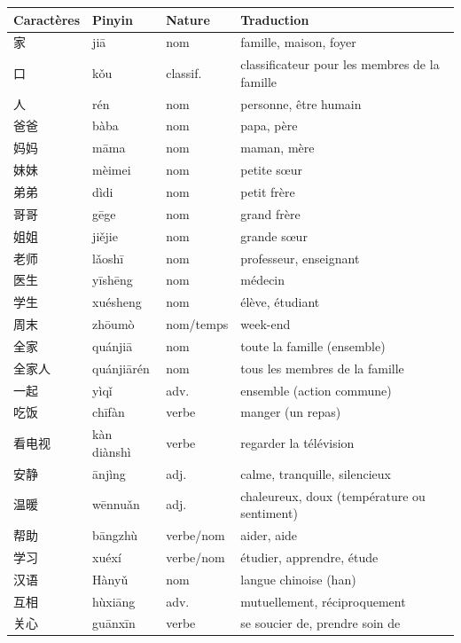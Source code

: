 \documentclass[11pt]{article}
\begin{document}
\begin{center}
\begin{tabularx}{\linewidth}{|X|X|X|X|}\hline
\rowcolor{popblueL} \textbf{Caractères} & \textbf{Pinyin} & \textbf{Nature} & \textbf{Traduction} \\ \hline
家 & jiā & nom & famille, maison, foyer \\ \hline
口 & kǒu & classif. & classificateur pour les membres de la famille \\ \hline
人 & rén & nom & personne, être humain \\ \hline
爸爸 & bàba & nom & papa, père \\ \hline
妈妈 & māma & nom & maman, mère \\ \hline
妹妹 & mèimei & nom & petite sœur \\ \hline
弟弟 & dìdi & nom & petit frère \\ \hline
哥哥 & gēge & nom & grand frère \\ \hline
姐姐 & jiějie & nom & grande sœur \\ \hline
老师 & lǎoshī & nom & professeur, enseignant \\ \hline
医生 & yīshēng & nom & médecin \\ \hline
学生 & xuésheng & nom & élève, étudiant \\ \hline
周末 & zhōumò & nom/temps & week-end \\ \hline
全家 & quánjiā & nom & toute la famille (ensemble) \\ \hline
全家人 & quánjiārén & nom & tous les membres de la famille \\ \hline
一起 & yìqǐ & adv. & ensemble (action commune) \\ \hline
吃饭 & chīfàn & verbe & manger (un repas) \\ \hline
看电视 & kàn diànshì & verbe & regarder la télévision \\ \hline
安静 & ānjìng & adj. & calme, tranquille, silencieux \\ \hline
温暖 & wēnnuǎn & adj. & chaleureux, doux (température ou sentiment) \\ \hline
帮助 & bāngzhù & verbe/nom & aider, aide \\ \hline
学习 & xuéxí & verbe/nom & étudier, apprendre, étude \\ \hline
汉语 & Hànyǔ & nom & langue chinoise (han) \\ \hline
互相 & hùxiāng & adv. & mutuellement, réciproquement \\ \hline
关心 & guānxīn & verbe & se soucier de, prendre soin de \\ \hline

\end{tabularx}
\end{center}
\end{document}
